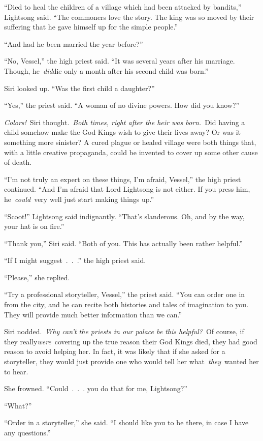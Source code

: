 “Died to heal the children of a village which had been attacked by bandits,” Lightsong said. “The commoners love the story. The king was so moved by their suffering that he gave himself up for the simple people.”

“And had he been married the year before?”

“No, Vessel,” the high priest said. “It was several years after his marriage. Though, he~\textit{did}die only a month after his second child was born.”

Siri looked up. “Was the first child a daughter?”

“Yes,” the priest said. “A woman of no divine powers. How did you know?”

\textit{Colors!}~Siri thought.~\textit{Both times, right after the heir was born.}~Did having a child somehow make the God Kings wish to give their lives away? Or was it something more sinister? A cured plague or healed village were both things that, with a little creative propaganda, could be invented to cover up some other cause of death.

“I’m not truly an expert on these things, I’m afraid, Vessel,” the high priest continued. “And I’m afraid that Lord Lightsong is not either. If you press him, he~\textit{could}~very well just start making things up.”

“Scoot!” Lightsong said indignantly. “That’s slanderous. Oh, and by the way, your hat is on fire.”

“Thank you,” Siri said. “Both of you. This has actually been rather helpful.”

“If I might suggest~.~.~.” the high priest said.

“Please,” she replied.

“Try a professional storyteller, Vessel,” the priest said. “You can order one in from the city, and he can recite both histories and tales of imagination to you. They will provide much better information than we can.”

Siri nodded.~\textit{Why can’t the priests in our palace be this helpful?}~Of course, if they really\textit{were}~covering up the true reason their God Kings died, they had good reason to avoid helping her. In fact, it was likely that if she asked for a storyteller, they would just provide one who would tell her what~\textit{they}~wanted her to hear.

She frowned. “Could~.~.~. you do that for me, Lightsong?”

“What?”

“Order in a storyteller,” she said. “I should like you to be there, in case I have any questions.”

